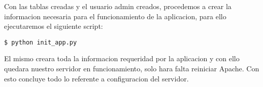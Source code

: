 Con las tablas creadas y el usuario admin creados, procedemos a crear la
informacion necesaria para el funcionamiento de la aplicacion, para ello
ejecutaremos el siguiente script:

\begin{lstlisting}[style=consola]
$ python init_app.py
\end{lstlisting}

El mismo creara toda la informacion requeridad por la aplicacion y con ello
quedara nuestro servidor en funcionamiento, solo hara falta reiniciar Apache.
Con esto concluye todo lo referente a configuracion del servidor.
































